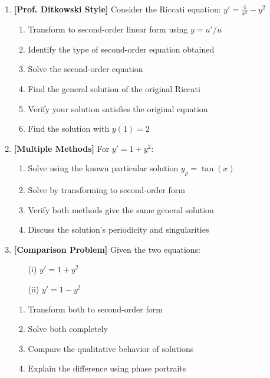 \documentclass[12pt]{article}
\begin{document}
\begin{enumerate}[resume]
    \item \textbf{[Prof. Ditkowski Style]}
    Consider the Riccati equation: $y' = \frac{4}{x^{2}} - y^{2}$
    \begin{enumerate}[label=(\alph*)]
        \item Transform to second-order linear form using $y = u'/u$
        \item Identify the type of second-order equation obtained
        \item Solve the second-order equation
        \item Find the general solution of the original Riccati
        \item Verify your solution satisfies the original equation
        \item Find the solution with $y(1) = 2$
    \end{enumerate}

    \item \textbf{[Multiple Methods]}
    For $y' = 1 + y^{2}$:
    \begin{enumerate}[label=(\alph*)]
        \item Solve using the known particular solution $y_{p} = \tan(x)$
        \item Solve by transforming to second-order form
        \item Verify both methods give the same general solution
        \item Discuss the solution's periodicity and singularities
    \end{enumerate}

    \item \textbf{[Comparison Problem]}
    Given the two equations:
    \begin{itemize}
        \item[(i)] $y' = 1 + y^{2}$
        \item[(ii)] $y' = 1 - y^{2}$
    \end{itemize}
    \begin{enumerate}[label=(\alph*)]
        \item Transform both to second-order form
        \item Solve both completely
        \item Compare the qualitative behavior of solutions
        \item Explain the difference using phase portraits
    \end{enumerate}


\end{enumerate}
\end{document}

